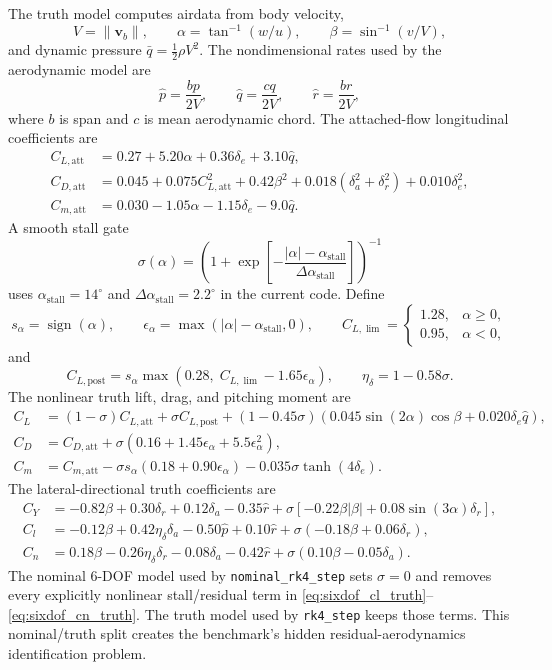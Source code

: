 \documentclass[11pt]{article}
\begin{document}
The truth model computes airdata from body velocity,
\[
V=\|\mathbf{v}_b\|,\qquad \alpha=\tan^{-1}(w/u),\qquad \beta=\sin^{-1}(v/V),
\]
and dynamic pressure $\bar{q}=\frac{1}{2}\rho V^2$. The nondimensional rates used by the aerodynamic model are
\[
\hat{p}=\frac{bp}{2V},\qquad
\hat{q}=\frac{cq}{2V},\qquad
\hat{r}=\frac{br}{2V},
\]
where $b$ is span and $c$ is mean aerodynamic chord. The attached-flow longitudinal coefficients are
\begin{align}
C_{L,\mathrm{att}} &= 0.27 + 5.20\alpha + 0.36\delta_e + 3.10\hat{q}, \label{eq:sixdof_cl_att}\\
C_{D,\mathrm{att}} &= 0.045 + 0.075C_{L,\mathrm{att}}^2 + 0.42\beta^2
    +0.018(\delta_a^2+\delta_r^2)+0.010\delta_e^2, \label{eq:sixdof_cd_att}\\
C_{m,\mathrm{att}} &= 0.030 - 1.05\alpha - 1.15\delta_e - 9.0\hat{q}. \label{eq:sixdof_cm_att}
\end{align}
A smooth stall gate
\[
\sigma(\alpha)=\left(1+\exp\left[-\frac{|\alpha|-\alpha_{\mathrm{stall}}}{\Delta\alpha_{\mathrm{stall}}}\right]\right)^{-1}
\]
uses $\alpha_{\mathrm{stall}}=14^\circ$ and $\Delta\alpha_{\mathrm{stall}}=2.2^\circ$ in the current code. Define
\[
s_\alpha=\operatorname{sign}(\alpha),\qquad
\epsilon_\alpha=\max(|\alpha|-\alpha_{\mathrm{stall}},0),\qquad
C_{L,\lim}=\begin{cases}1.28,&\alpha\ge 0,\\0.95,&\alpha<0,\end{cases}
\]
and
\[
C_{L,\mathrm{post}}=s_\alpha\max(0.28,\;C_{L,\lim}-1.65\epsilon_\alpha),\qquad
\eta_\delta=1-0.58\sigma.
\]
The nonlinear truth lift, drag, and pitching moment are
\begin{align}
C_L &= (1-\sigma)C_{L,\mathrm{att}}+\sigma C_{L,\mathrm{post}}
 +(1-0.45\sigma)\left(0.045\sin(2\alpha)\cos\beta+0.020\delta_e\hat{q}\right), \label{eq:sixdof_cl_truth}\\
C_D &= C_{D,\mathrm{att}}+\sigma\left(0.16+1.45\epsilon_\alpha+5.5\epsilon_\alpha^2\right), \label{eq:sixdof_cd_truth}\\
C_m &= C_{m,\mathrm{att}}
 -\sigma s_\alpha\left(0.18+0.90\epsilon_\alpha\right)
 -0.035\sigma\tanh(4\delta_e). \label{eq:sixdof_cm_truth}
\end{align}
The lateral-directional truth coefficients are
\begin{align}
C_Y &= -0.82\beta + 0.30\delta_r + 0.12\delta_a - 0.35\hat{r}
 +\sigma\left[-0.22\beta|\beta|+0.08\sin(3\alpha)\delta_r\right], \label{eq:sixdof_cy_truth}\\
C_l &= -0.12\beta + 0.42\eta_\delta\delta_a - 0.50\hat{p} + 0.10\hat{r}
 +\sigma(-0.18\beta+0.06\delta_r), \label{eq:sixdof_clroll_truth}\\
C_n &= 0.18\beta - 0.26\eta_\delta\delta_r - 0.08\delta_a - 0.42\hat{r}
 +\sigma(0.10\beta-0.05\delta_a). \label{eq:sixdof_cn_truth}
\end{align}
The nominal 6-DOF model used by \texttt{nominal\_rk4\_step} sets $\sigma=0$ and removes every explicitly nonlinear stall/residual term in \eqref{eq:sixdof_cl_truth}--\eqref{eq:sixdof_cn_truth}. The truth model used by \texttt{rk4\_step} keeps those terms. This nominal/truth split creates the benchmark's hidden residual-aerodynamics identification problem.
\end{document}
